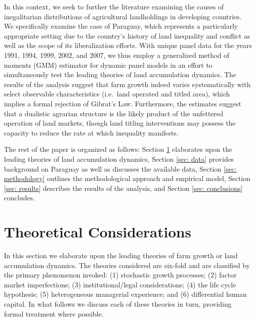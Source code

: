 \documentclass[english]{article}
\begin{document}
In this context, we seek to further the literature examining the causes of 
inegalitarian distributions of agricultural landholdings in developing 
countries.
We specifically examine the case of Paraguay, which represents a particularly 
appropriate setting due to the country's history of land inequality and conflict 
as well as the scope of its liberalization efforts.
With unique panel data for the years 1991, 1994, 1999, 2002, and 2007, we thus 
employ a generalized method of moments (GMM) estimator for dynamic panel 
models in an effort to simultaneously test the leading theories of land 
accumulation dynamics.
The results of the analysis suggest that farm growth indeed varies 
systematically with select observable characteristics 
(i.e.\ land operated and titled area), which implies a formal rejection of 
Gibrat's Law. 
Furthermore, the estimates suggest that a dualistic agrarian structure is the 
likely product of the unfettered operation of land markets, though land titling 
interventions may possess the capacity to reduce the rate at which inequality 
manifests.

The rest of the paper is organized as follows: Section \ref{sec: theories} 
elaborates upon the leading theories of land accumulation dynamics, 
Section \ref{sec: data} provides background on Paraguay as well as discusses 
the available data, Section \ref{sec: methodology} outlines the methodological 
approach and empirical model, Section \ref{sec: results} describes the results 
of the analysis, and Section \ref{sec: conclusions} concludes.


\section{Theoretical Considerations}
\label{sec: theories}

In this section we elaborate upon the leading theories of farm growth or 
land accumulation dynamics.  
The theories considered are six-fold and are classified by the primary 
phenomenon invoked: (1) stochastic growth processes; 
(2) factor market imperfections; (3) institutional/legal considerations; 
(4) the life cycle hypothesis; (5) heterogeneous managerial experience; and 
(6) differential human capital. 
In what follows we discuss each of these theories in turn, providing formal
treatment where possible.
\end{document}
